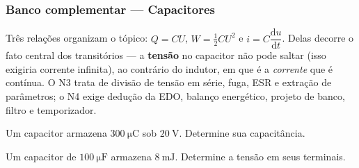
\subsubsection*{Banco complementar --- Capacitores}

\begin{atencao}
Três relações organizam o tópico: $Q=CU$, $W=\frac12CU^{2}$ e
$i=C\dfrac{\mathrm{d}u}{\mathrm{d}t}$. Delas decorre o fato central dos
transitórios --- a \textbf{tensão} no capacitor não pode saltar (isso exigiria
corrente infinita), ao contrário do indutor, em que é a \emph{corrente} que é
contínua. O N3 trata de divisão de tensão em série, fuga, ESR e extração de
parâmetros; o N4 exige dedução da EDO, balanço energético, projeto de banco,
filtro e temporizador.
\end{atencao}

\blocofixacao

\begin{questao}[1]{}
Um capacitor armazena $\SI{300}{\micro\coulomb}$ sob $\SI{20}{\volt}$.
Determine sua capacitância.
\end{questao}

\begin{questao}[1]{}
Um capacitor de $\SI{100}{\micro\farad}$ armazena $\SI{8}{\milli\joule}$.
Determine a tensão em seus terminais.
\end{questao}

